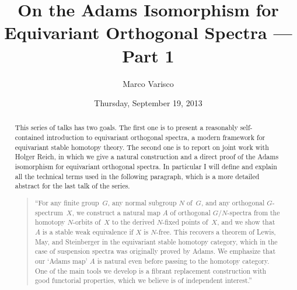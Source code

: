 \documentclass{UAmathtalk}
\author{Marco Varisco}
\title{On the Adams Isomorphism for Equivariant Orthogonal Spectra --- Part 1}
\date{Thursday, September 19, 2013}
\begin{document}
\maketitle

\begin{abstract}
This series of talks has two goals.
The first one is to present a reasonably self-contained introduction to equivariant orthogonal spectra, a modern framework for equivariant stable homotopy theory.
The second one is to report on joint work with Holger Reich, in which we give a natural construction and a direct proof of the Adams isomorphism for equivariant orthogonal spectra.
In particular I will define and explain all the technical terms used in the following paragraph, which is a more detailed abstract for the last talk of the series.
\begin{quote}
``For any finite group~$G$, any normal subgroup $N$ of~$G$, and any orthogonal $G$-spectrum~$X$, we construct a natural map $A$ of orthogonal $G/N$-spectra from the homotopy $N$-orbits of~$X$ to the derived $N$-fixed points of~$X$, and we show that $A$ is a stable weak equivalence if $X$ is $N$-free.  This recovers a theorem of Lewis, May, and Steinberger in the equivariant stable homotopy category, which in the case of suspension spectra was originally proved by Adams.  We emphasize that our `Adams map' $A$ is natural even before passing to the homotopy category.  One of the main tools we develop is a fibrant replacement construction with good functorial properties, which we believe is of independent interest.''
\end{quote}
\end{abstract}
\end{document}
